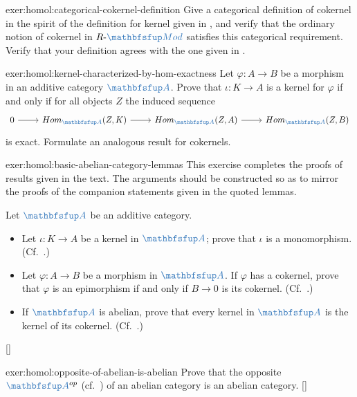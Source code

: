 \begin{exer}{}{exer:homol:categorical-cokernel-definition}
  Give a categorical definition of cokernel in the spirit of the
  definition for kernel given in , and verify
  that the ordinary notion of cokernel in $R\text{-}\categ{Mod}$
  satisfies this categorical requirement. Verify that your definition
  agrees with the one given in .
\end{exer}
\begin{exer}{}{exer:homol:kernel-characterized-by-hom-exactness}
  Let $\varphi : A \to B$ be a morphism in an additive category
  $\categ{A}$. Prove that $\iota : K \to A$ is a kernel for $\varphi$
  if and only if for all objects $Z$ the induced sequence
  \[\begin{tikzcd}
      0 \arrow[r] & \Hom_{\categ{A}}(Z,K) \arrow[r] &
      \Hom_{\categ{A}}(Z,A) \arrow[r] & \Hom_{\categ{A}}(Z,B)
    \end{tikzcd}\] is exact. Formulate an analogous result for
  cokernels.
\end{exer}
\begin{exer}{}{exer:homol:basic-abelian-category-lemmas}
  \exerused{} This exercise completes the proofs of results given in
  the text. The arguments should be constructed so as to mirror the
  proofs of the companion statements given in the quoted lemmas.

  Let $\categ{A}$ be an additive category.
  \begin{itemize}
  \item Let $\iota : K \to A$ be a kernel in $\categ{A}$; prove that
    $\iota$ is a monomorphism. (Cf.\ .)
  \item Let $\varphi : A \to B$ be a morphism in $\categ{A}$. If
    $\varphi$ has a cokernel, prove that $\varphi$ is an epimorphism
    if and only if $B \to 0$ is its cokernel. (Cf.\
    .)
  \item If $\categ{A}$ is abelian, prove that every kernel in
    $\categ{A}$ is the kernel of its cokernel. (Cf.\
    .)
  \end{itemize} []
\end{exer}
\begin{exer}{}{exer:homol:opposite-of-abelian-is-abelian}
  \exerused{} Prove that the opposite $\categ{A}^{op}$ (cf.\
  ) of an abelian category is an
  abelian category.
  []
\end{exer}
